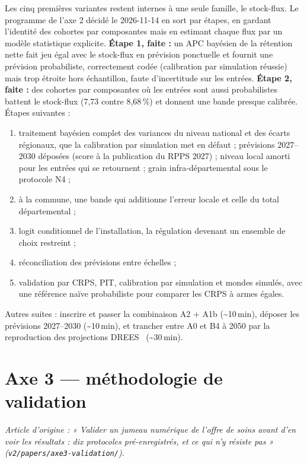 Les cinq premières variantes restent internes à une seule famille, le stock-flux. Le programme de
l'axe 2 décidé le 2026-11-14 en sort par étapes, en gardant l'identité des cohortes par composantes
mais en estimant chaque flux par un modèle statistique explicite. \textbf{Étape 1, faite :} un APC
bayésien de la rétention nette fait jeu égal avec le stock-flux en prévision ponctuelle et fournit une
prévision probabiliste, correctement codée (calibration par simulation réussie) mais trop étroite hors
échantillon, faute d'incertitude sur les entrées. \textbf{Étape 2, faite :} des cohortes par
composantes où les entrées sont aussi probabilistes battent le stock-flux (7,73 contre
8,68\,\%\mesure) et donnent une bande presque calibrée. Étapes suivantes :
\begin{enumerate}
  \item traitement bayésien complet des variances du niveau national et des écarts régionaux, que la
        calibration par simulation met en défaut ; prévisions 2027--2030 déposées (score à la
        publication du RPPS 2027) ; niveau local amorti
        pour les entrées qui se retournent ; grain infra-départemental sous le protocole N4 ;
  \item à la commune, une bande qui additionne l'erreur locale et celle du total départemental ;
  \item logit conditionnel de l'installation, la régulation devenant un ensemble de choix restreint ;
  \item réconciliation des prévisions entre échelles ;
  \item validation par CRPS, PIT, calibration par simulation et mondes simulés, avec une référence
        naïve probabiliste pour comparer les CRPS à armes égales.
\end{enumerate}
Autres suites : inscrire et passer la combinaison A2 + A1b (\textasciitilde{}10\,min), déposer les
prévisions 2027--2030 (\textasciitilde{}10\,min), et trancher entre A0 et B4 à 2050 par la
reproduction des projections DREES~\cite{a2-drees2021dd76} (\textasciitilde{}30\,min).



\part{Axe 3 --- méthodologie de validation}
\noindent\textit{Article d'origine : « Valider un jumeau numérique de l'offre de soins avant d'en voir les résultats : dix protocoles pré-enregistrés, et ce qui n'y résiste pas » (\texttt{v2/papers/axe3-validation/}).}

